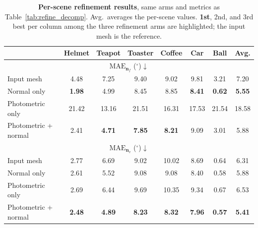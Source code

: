 \begin{table}[t]
\centering
\footnotesize
\setlength{\tabcolsep}{3pt}
\caption{\textbf{Per-scene refinement results}, same arms and metrics as
Table~\ref{tab:refine_decomp}. Avg.\ averages the per-scene values. \colorbox{green!25}{\textbf{1st}}, \colorbox{orange!25}{2nd}, and \colorbox{yellow!25}{3rd} best per column among the three refinement arms are highlighted; the input mesh is the reference.}
\label{tab:refine_perscene}
\begin{tabular}{@{}lccccccc@{}}
\toprule
& Helmet & Teapot & Toaster & Coffee & Car & Ball & Avg. \\
\midrule
\multicolumn{8}{c}{$\mathrm{MAE}_{\mathbf{n}_f}$ ($^\circ$)$\downarrow$} \\
\midrule
Input mesh & 4.48 & 7.25 & 9.40 & 9.02 & 9.81 & 3.21 & 7.20 \\
\midrule
Normal only & \cellcolor{green!25} \textbf{1.98} & \cellcolor{orange!25} 4.99 & \cellcolor{orange!25} 8.45 & \cellcolor{orange!25} 8.85 & \cellcolor{green!25} \textbf{8.41} & \cellcolor{green!25} \textbf{0.62} & \cellcolor{green!25} \textbf{5.55} \\
Photometric only & \cellcolor{yellow!25} 21.42 & \cellcolor{yellow!25} 13.16 & \cellcolor{yellow!25} 21.51 & \cellcolor{yellow!25} 16.31 & \cellcolor{yellow!25} 17.53 & \cellcolor{yellow!25} 21.54 & \cellcolor{yellow!25} 18.58 \\
Photometric + normal & \cellcolor{orange!25} 2.41 & \cellcolor{green!25} \textbf{4.71} & \cellcolor{green!25} \textbf{7.85} & \cellcolor{green!25} \textbf{8.21} & \cellcolor{orange!25} 9.09 & \cellcolor{orange!25} 3.01 & \cellcolor{orange!25} 5.88 \\
\midrule
\multicolumn{8}{c}{$\mathrm{MAE}_{\mathbf{n}_v}$ ($^\circ$)$\downarrow$} \\
\midrule
Input mesh & 2.77 & 6.69 & 9.02 & 10.02 & 8.69 & 0.64 & 6.31 \\
\midrule
Normal only & \cellcolor{orange!25} 2.61 & \cellcolor{orange!25} 5.52 & \cellcolor{orange!25} 9.08 & \cellcolor{orange!25} 9.08 & \cellcolor{orange!25} 8.40 & \cellcolor{orange!25} 0.58 & \cellcolor{orange!25} 5.88 \\
Photometric only & \cellcolor{yellow!25} 2.69 & \cellcolor{yellow!25} 6.44 & \cellcolor{yellow!25} 9.69 & \cellcolor{yellow!25} 10.35 & \cellcolor{yellow!25} 9.34 & \cellcolor{yellow!25} 0.67 & \cellcolor{yellow!25} 6.53 \\
Photometric + normal & \cellcolor{green!25} \textbf{2.48} & \cellcolor{green!25} \textbf{4.89} & \cellcolor{green!25} \textbf{8.23} & \cellcolor{green!25} \textbf{8.32} & \cellcolor{green!25} \textbf{7.96} & \cellcolor{green!25} \textbf{0.57} & \cellcolor{green!25} \textbf{5.41} \\

\end{tabular}
\end{table}
